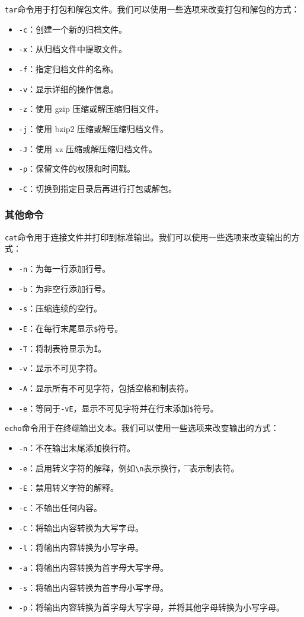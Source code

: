 \documentclass[../main.tex]{subfiles}
\begin{document}
\texttt{tar}命令用于打包和解包文件。我们可以使用一些选项来改变打包和解包的方式：
\begin{itemize}
  \item \texttt{-c}：创建一个新的归档文件。
  \item \texttt{-x}：从归档文件中提取文件。
  \item \texttt{-f}：指定归档文件的名称。
  \item \texttt{-v}：显示详细的操作信息。
  \item \texttt{-z}：使用 gzip 压缩或解压缩归档文件。
  \item \texttt{-j}：使用 bzip2 压缩或解压缩归档文件。
  \item \texttt{-J}：使用 xz 压缩或解压缩归档文件。
  \item \texttt{-p}：保留文件的权限和时间戳。
  \item \texttt{-C}：切换到指定目录后再进行打包或解包。
\end{itemize}

\subsubsection{其他命令}

\texttt{cat}命令用于连接文件并打印到标准输出。我们可以使用一些选项来改变输出的方式：
\begin{itemize}
  \item \texttt{-n}：为每一行添加行号。
  \item \texttt{-b}：为非空行添加行号。
  \item \texttt{-s}：压缩连续的空行。
  \item \texttt{-E}：在每行末尾显示\texttt{\$}符号。
  \item \texttt{-T}：将制表符显示为\texttt{\^I}。
  \item \texttt{-v}：显示不可见字符。
  \item \texttt{-A}：显示所有不可见字符，包括空格和制表符。
  \item \texttt{-e}：等同于\texttt{-vE}，显示不可见字符并在行末添加\texttt{\$}符号。
\end{itemize}

\texttt{echo}命令用于在终端输出文本。我们可以使用一些选项来改变输出的方式：
\begin{itemize}
  \item \texttt{-n}：不在输出末尾添加换行符。
  \item \texttt{-e}：启用转义字符的解释，例如\texttt{\textbackslash n}表示换行，\texttt{\t}表示制表符。
  \item \texttt{-E}：禁用转义字符的解释。
  \item \texttt{-c}：不输出任何内容。
  \item \texttt{-C}：将输出内容转换为大写字母。
  \item \texttt{-l}：将输出内容转换为小写字母。
  \item \texttt{-a}：将输出内容转换为首字母大写字母。
  \item \texttt{-s}：将输出内容转换为首字母小写字母。
  \item \texttt{-p}：将输出内容转换为首字母大写字母，并将其他字母转换为小写字母。
\end{itemize}
\end{document}
